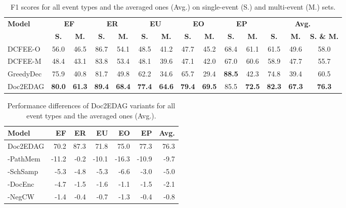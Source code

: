\documentclass[11pt,a4paper]{article}
\begin{document}
\begin{table*}[tb]\small
\centering
\addtolength{\tabcolsep}{-1pt}
\begin{tabular}{l | cc | cc | cc | cc | cc | ccc}
\toprule
\multirow{2}{*}{\textbf{Model}}
& \multicolumn{2}{c|}{\textbf{EF}}
& \multicolumn{2}{c|}{\textbf{ER}}
& \multicolumn{2}{c|}{\textbf{EU}}
& \multicolumn{2}{c|}{\textbf{EO}}
& \multicolumn{2}{c|}{\textbf{EP}}
& \multicolumn{3}{c}{\textbf{Avg.}}
\\
& \textbf{S.} & \textbf{M.}
& \textbf{S.} & \textbf{M.}
& \textbf{S.} & \textbf{M.}
& \textbf{S.} & \textbf{M.}
& \textbf{S.} & \textbf{M.}
& \textbf{S.} & \textbf{M.} & \textbf{S. \& M.}
\\
\midrule
DCFEE-O  
& 56.0 & 46.5          & 86.7 & 54.1          & 48.5 & 41.2          & 47.7 & 45.2          & 68.4 & 61.1 & 61.5 & 49.6 & 58.0
\\
DCFEE-M  
& 48.4 & 43.1     	 & 83.8 & 53.4     	 & 48.1 & 39.6     	 & 47.1 & 42.0     	 & 67.0 & 60.6  & 58.9 & 47.7 & 55.7
\\
\midrule
GreedyDec  
& 75.9 & 40.8          & 81.7 & 49.8          & 62.2 & 34.6          & 65.7 & 29.4      & \textbf{88.5} & 42.3  & 74.8 & 39.4 & 60.5
\\
Doc2EDAG 
& \textbf{80.0} & \textbf{61.3}          & \textbf{89.4} & \textbf{68.4}          & \textbf{77.4} & \textbf{64.6}          & \textbf{79.4} & \textbf{69.5}          & 85.5 & \textbf{72.5}  & \textbf{82.3} & \textbf{67.3} &  \textbf{76.3}
\\
\bottomrule
\end{tabular}
\caption{F1 scores for all event types and the averaged ones (Avg.) on single-event (S.) and multi-event (M.) sets.}
\label{tab:single_multi}
\end{table*}



\begin{table}[tb]\small
\centering
\addtolength{\tabcolsep}{-1.55pt}
\begin{tabular}{l | r | r | r | r | r | r }
\toprule
\textbf{Model} & \textbf{EF} & \textbf{ER} & \textbf{EU} & \textbf{EO} & \textbf{EP} & \textbf{Avg.}
\\
\midrule
Doc2EDAG 
& 70.2  & 87.3 & 71.8  & 75.0  & 77.3  & 76.3
\\
\midrule
-PathMem  
& -11.2 & -0.2 & -10.1 & -16.3 & -10.9 & -9.7
\\
-SchSamp
& -5.3 & -4.8 & -5.3 & -6.6 & -3.0 & -5.0
\\
-DocEnc  
& -4.7  & -1.5 & -1.6  & -1.1  & -1.5  & -2.1
\\
-NegCW
& -1.4 & -0.4 & -0.7 & -1.3 & -0.4 & -0.8
\\
\bottomrule
\end{tabular}
\caption{Performance differences of Doc2EDAG variants for all event types and the averaged ones (Avg.).}
\label{tab:ablation_study}
\end{table}
\end{document}
